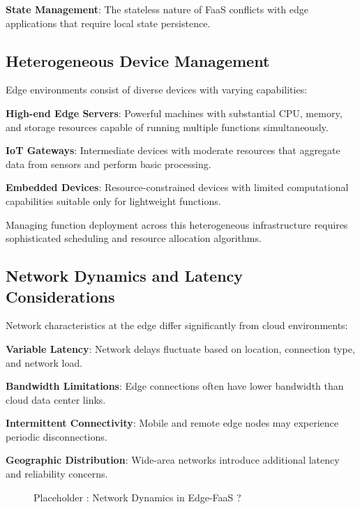 \textbf{State Management}: The stateless nature of FaaS conflicts with edge applications that require local state persistence.

\subsection{Heterogeneous Device Management}

Edge environments consist of diverse devices with varying capabilities:

\textbf{High-end Edge Servers}: Powerful machines with substantial CPU, memory, and storage resources capable of running multiple functions simultaneously.

\textbf{IoT Gateways}: Intermediate devices with moderate resources that aggregate data from sensors and perform basic processing.

\textbf{Embedded Devices}: Resource-constrained devices with limited computational capabilities suitable only for lightweight functions.

Managing function deployment across this heterogeneous infrastructure requires sophisticated scheduling and resource allocation algorithms.

\subsection{Network Dynamics and Latency Considerations}

Network characteristics at the edge differ significantly from cloud environments:

\textbf{Variable Latency}: Network delays fluctuate based on location, connection type, and network load.

\textbf{Bandwidth Limitations}: Edge connections often have lower bandwidth than cloud data center links.

\textbf{Intermittent Connectivity}: Mobile and remote edge nodes may experience periodic disconnections.

\textbf{Geographic Distribution}: Wide-area networks introduce additional latency and reliability concerns.

\begin{figure}[h]
    \centering
    \caption{ Placeholder : Network Dynamics in Edge-FaaS ?}
    \label{fig:network_dynamics}
\end{figure}


